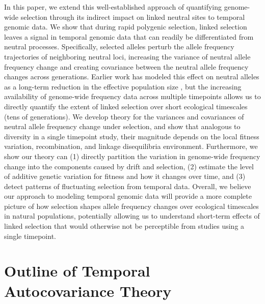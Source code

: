 \documentclass[11pt]{article}
\begin{document}
In this paper, we extend this well-established approach of quantifying
genome-wide selection through its indirect impact on linked neutral sites to
temporal genomic data. We show that during rapid polygenic selection, linked
selection leaves a signal in temporal genomic data that can readily be
differentiated from neutral processes. Specifically, selected alleles perturb
the allele frequency trajectories of neighboring neutral loci, increasing the
variance of neutral allele frequency change and creating covariance between the
neutral allele frequency changes across generations.  Earlier work has modeled
this effect on neutral alleles as a long-term reduction in the effective
population size
\parencite{Robertson1961-ho,Santiago1995-hx,Santiago1998-bs,Wray1990-zf,J_A_Woolliams_N_R_Wray_R_Thompson2008-qo},
but the increasing availability of genome-wide frequency data across multiple
timepoints allows us to directly quantify the extent of linked selection over
short ecological timescales (tens of generations). We develop theory for the
variances and covariances of neutral allele frequency change under selection,
and show that analogous to diversity in a single timepoint study, their
magnitude depends on the local fitness variation, recombination, and linkage
disequilibria environment. Furthermore, we show our theory can (1) directly
partition the variation in genome-wide frequency change into the components
caused by drift and selection, (2) estimate the level of additive genetic
variation for fitness and how it changes over time, and (3) detect patterns of
fluctuating selection from temporal data. Overall, we believe our approach to
modeling temporal genomic data will provide a more complete picture of how
selection shapes allele frequency changes over ecological timescales in natural
populations, potentially allowing us to understand short-term effects of linked
selection that would otherwise not be perceptible from studies using a single
timepoint. 

\section{Outline of Temporal Autocovariance Theory}
\label{sec:outline-temp}
\end{document}
